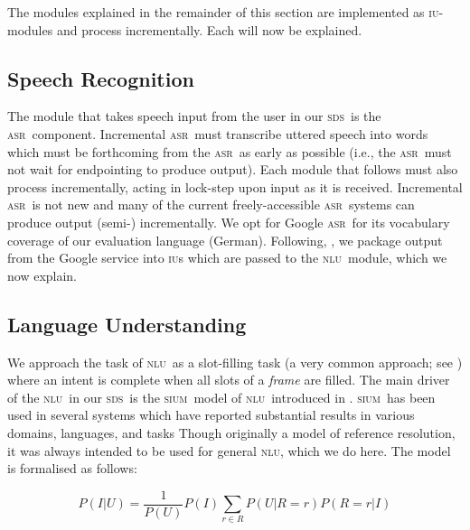 \documentclass[11pt]{article}
\newcommand{\sds}[0]{\textsc{sds}}
\newcommand{\nlu}[0]{\textsc{nlu}}
\newcommand{\sium}[0]{\textsc{sium}}
\newcommand{\asr}[0]{\textsc{asr}}
\newcommand{\iu}[0]{\textsc{iu}}
\begin{document}
The modules explained in the remainder of this section are implemented as \iu-modules and process incrementally. Each will now be explained. 

\subsection{Speech Recognition}

The module that takes speech input from the user in our \sds\ is the \asr\ component. Incremental \asr\ must transcribe uttered speech into words which must be forthcoming from the \asr\ as early as possible (i.e., the \asr\ must not wait for endpointing to produce output). Each module that follows must also process incrementally, acting in lock-step upon input as it is received. Incremental \asr\ is not new \cite{baumannetal2009:naacl} and many of the current freely-accessible \asr\ systems can produce output (semi-) incrementally. We opt for Google \asr\ for its vocabulary coverage of our evaluation language (German). Following, , we package output from the Google service into \iu s which are passed to the \nlu\ module, which we now explain. 

\subsection{Language Understanding}

We approach the task of \nlu\ as a slot-filling task (a very common approach; see ) where an intent is complete when all slots of a \emph{frame} are filled. The main driver of the \nlu\ in our \sds\ is the \sium\ model of \nlu\ introduced in . \sium\ has been used in several systems which have reported substantial results in various domains, languages, and tasks \cite{Han2015,Kennington2015_naacl,Kennington2017} Though originally a model of reference resolution, it was always intended to be used for general \nlu, which we do here. The model is formalised as follows:

\vspace{-0.25cm}
{\small
\begin{center}
\begin{equation}
   P(I|U) = \frac{1}{P(U)} P(I)\sum_{r\in R} P(U|R=r)P(R=r|I) 
\label{eq:disc1}
\end{equation}
\end{center}
}
\end{document}
